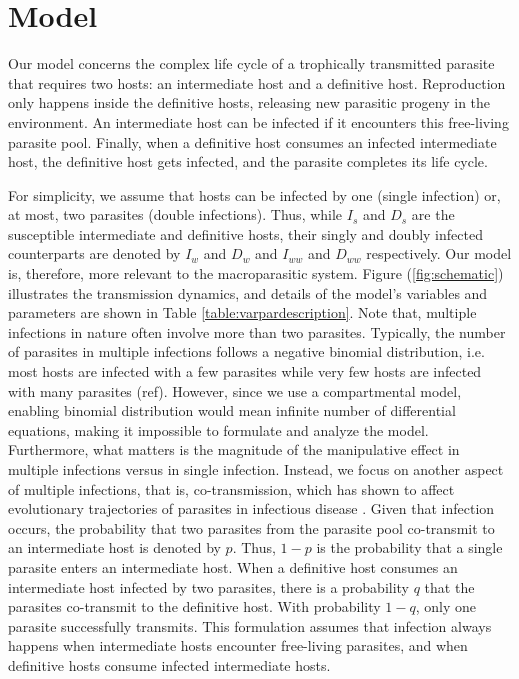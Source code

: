 \documentclass[a4paper]{scrartcl}
\begin{document}
\section*{Model}

Our model concerns the complex life cycle of a trophically transmitted parasite that requires two hosts: an intermediate host and a definitive host. 
Reproduction only happens inside the definitive hosts, releasing new parasitic progeny in the environment. 
An intermediate host can be infected if it encounters this free-living parasite pool. 
Finally, when a definitive host consumes an infected intermediate host, the definitive host gets infected, and the parasite completes its life cycle.

For simplicity, we assume that hosts can be infected by one (single infection) or, at most, two parasites (double infections).
Thus, while $I_s$ and $D_s$ are the susceptible intermediate and definitive hosts, their singly and doubly infected counterparts are denoted by $I_w$ and $D_w$ and $I_{ww}$ and $D_{ww}$ respectively.
Our model is, therefore, more relevant to the macroparasitic system.
Figure (\ref{fig:schematic}) illustrates the transmission dynamics, and details of the model's variables and parameters are shown in Table \ref{table:varpardescription}.
Note that, multiple infections in nature often involve more than two parasites.
Typically, the number of parasites in multiple infections follows a negative binomial distribution, i.e. most hosts are infected with a few parasites while very few hosts are infected with many parasites (ref).
However, since we use a compartmental model, enabling binomial distribution would mean infinite number of differential equations, making it impossible to formulate and analyze the model.
Furthermore, what matters is the magnitude of the manipulative effect in multiple infections versus in single infection.
Instead, we focus on another aspect of multiple infections, that is, co-transmission, which has shown to affect evolutionary trajectories of parasites in infectious disease \citep{Alizon2012}.
Given that infection occurs, the probability that two parasites from the parasite pool co-transmit to an intermediate host is denoted by $p$. 
Thus, $1-p$ is the probability that a single parasite enters an intermediate host. 
When a definitive host consumes an intermediate host infected by two parasites, there is a probability $q$ that the parasites co-transmit to the definitive host.
With probability $1-q$, only one parasite successfully transmits. 
This formulation assumes that infection always happens when intermediate hosts encounter free-living parasites, and when definitive hosts consume infected intermediate hosts.
\end{document}
